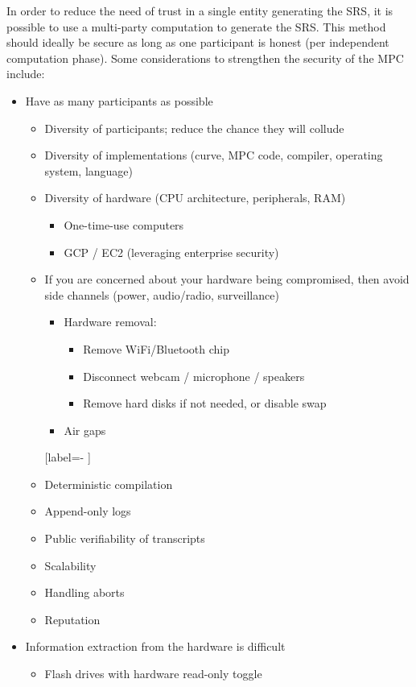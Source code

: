 In order to reduce the need of trust in a single entity generating the SRS, it is possible to use a multi-party computation to generate the SRS. 
This method should ideally be secure as long as one participant is honest (per independent computation phase). 
Some considerations to strengthen the security of the MPC include:
\begin{itemize}[label={- }]
    \item Have as many participants as possible
				\begin{itemize}
        \item Diversity of participants; reduce the chance they will collude
        \item Diversity of implementations (curve, MPC code, compiler, operating system, language)
        \item Diversity of hardware (CPU architecture, peripherals, RAM)
						\begin{itemize}[label={- }]
            \item One-time-use computers
            \item GCP / EC2 (leveraging enterprise security)
						\end{itemize}
        \item If you are concerned about your hardware being compromised, then avoid side channels (power, audio/radio, surveillance)
            \begin{itemize}[label={- }]
						\item Hardware removal:
								\begin{itemize}[label={- }]
                \item Remove WiFi/Bluetooth chip
                \item Disconnect webcam / microphone / speakers
                \item Remove hard disks if not needed, or disable swap
								\end{itemize}
            \item Air gaps
						\end{itemize}[label={- }]
        \item Deterministic compilation
        \item Append-only logs
        \item Public verifiability of transcripts
        \item Scalability
        \item Handling aborts
        \item Reputation
			\end{itemize}
    \item Information extraction from the hardware is difficult
				\begin{itemize}[label={- }]
        \item Flash drives with hardware read-only toggle
				\end{itemize}
\end{itemize}

